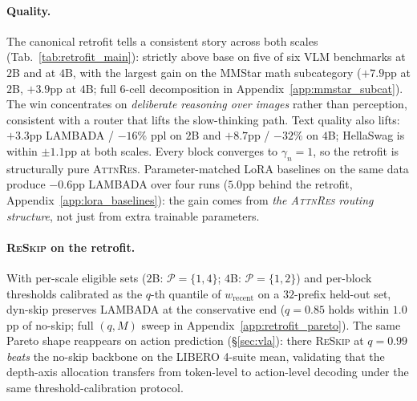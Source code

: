 \documentclass{article}
\newcommand{\attnres}{\textsc{AttnRes}}
\newcommand{\reskip}{\textsc{ReSkip}}
\begin{document}
\paragraph{Quality.}
The canonical retrofit tells a consistent story across both scales (Tab.~\ref{tab:retrofit_main}): strictly above base on five of six VLM benchmarks at $2$B and at $4$B, with the largest gain on the MMStar math subcategory ($+7.9$pp at $2$B, $+3.9$pp at $4$B; full $6$-cell decomposition in Appendix~\ref{app:mmstar_subcat}). The win concentrates on \emph{deliberate reasoning over images} rather than perception, consistent with a router that lifts the slow-thinking path. Text quality also lifts: $+3.3$pp LAMBADA / $-16\%$ ppl on $2$B and $+8.7$pp / $-32\%$ on $4$B; HellaSwag is within $\pm 1.1$pp at both scales. Every block converges to $\gamma_n{=}1$, so the retrofit is structurally pure \attnres{}. Parameter-matched LoRA baselines on the same data produce $-0.6$pp LAMBADA over four runs ($5.0$pp behind the retrofit, Appendix~\ref{app:lora_baselines}): the gain comes from \emph{the \attnres{} routing structure}, not just from extra trainable parameters.

\paragraph{\reskip{} on the retrofit.}
With per-scale eligible sets ($2$B: $\mathcal{P}{=}\{1,4\}$; $4$B: $\mathcal{P}{=}\{1,2\}$) and per-block thresholds calibrated as the $q$-th quantile of $w_{\text{recent}}$ on a $32$-prefix held-out set, dyn-skip preserves LAMBADA at the conservative end ($q{=}0.85$ holds within $1.0$pp of no-skip; full $(q,M)$ sweep in Appendix~\ref{app:retrofit_pareto}). The same Pareto shape reappears on action prediction (\S\ref{sec:vla}): there \reskip{} at $q{=}0.99$ \emph{beats} the no-skip backbone on the LIBERO 4-suite mean, validating that the depth-axis allocation transfers from token-level to action-level decoding under the same threshold-calibration protocol.
\end{document}

